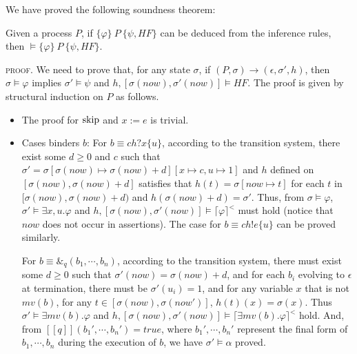 \documentclass{llncs}
\newcommand{\pskip}{\textmd{skip}}
\newcommand{\leadm}[1]{\xrightarrow{#1}}
\newcommand{\pstop}{\epsilon}
\newcommand{\seman}[1]{[\![#1 ]\!]}
\newcommand{\ptrue}{true}
\newcommand{\inference}[3]{\{#1\} \ #2\ \{#3\}}
\newcommand{\dceil}[1]{\lceil #1 \rceil}
\newcommand{\Pre}{\varphi}
\newcommand{\Post}{\psi}
\newcommand{\HF}{HF}
\begin{document}
We have proved the following soundness theorem:
\begin{theorem}
Given a process $P$, if $\inference{\Pre}{P}{\Post, \HF}$ can be deduced from the inference rules,
then $\models \inference{\Pre}{P}{\Post, \HF}$.
\end{theorem}
 \textsc{proof}.
We need to prove that, for any state $\sigma$, if $(P, \sigma) \leadm{} (\pstop, \sigma', h)$, then $\sigma \models \Pre$ implies
$\sigma' \models \Post$ and $h, [\sigma(now), \sigma'(now)] \models \HF$. The proof is given by structural induction on $P$ as follows.
  \begin{itemize}
    \item The proof for  $\pskip$ and $ x:=e$ is trivial.

    \item Cases binders $b$: For $b \equiv ch?x\{u\}$,  according to the transition system, there exist some $d\geq 0$ and $c$ such
    that
    $\sigma' = \sigma[\sigma(now) \mapsto \sigma(now) + d][x\mapsto c, u \mapsto 1]$ and $h$
    defined on $[\sigma(now), \sigma(now) + d]$ satisfies that $h(t) = \sigma[now \mapsto t]$ for
    each $t$ in $[\sigma(now), \sigma(now) + d)$ and $h(\sigma(now) + d) = \sigma'$.
    Thus, from $\sigma \models \Pre$, $\sigma' \models \exists x, u. \Pre$
    and $h, [\sigma(now), \sigma'(now)]  \models \dceil{\Pre}^<$ must hold (notice that $now$ does not occur
    in assertions). The case for $b \equiv ch!e\{u\}$
    can be proved similarly.

  For $b \equiv \&_q(b_1, \cdots, b_n)$, according to the transition system,
    there must exist some $d\geq 0$ such that $\sigma'(now) = \sigma(now) + d$, and
    for each $b_i$ evolving to $\pstop$ at termination, there must be $\sigma'(u_i) = 1$, and
    for any variable $x$ that is not $mv(b)$, for any
    $t \in [\sigma(now), \sigma(now')]$, $h(t)(x) = \sigma(x)$. Thus
    $\sigma' \models \exists mv(b) . \Pre$ and $h, [\sigma(now), \sigma'(now)]  \models
    \dceil{\exists mv(b) . \Pre}^<$ hold. And, from $\seman{q}(b_1', \cdots, b_n') = \ptrue$, where $b_1', \cdots, b_n'$ represent the final form of $b_1, \cdots, b_n$ during the execution of $b$, we have $\sigma' \models \alpha$ proved.


\end{itemize}
\end{document}
